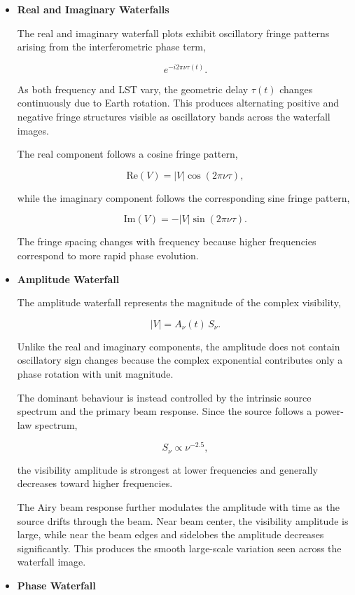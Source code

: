 \documentclass{article}
\begin{document}
\begin{itemize}

\item \textbf{Real and Imaginary Waterfalls}

The real and imaginary waterfall plots exhibit oscillatory fringe patterns arising from the interferometric phase term,

\[
e^{-i2\pi\nu\tau(t)}.
\]

As both frequency and LST vary, the geometric delay $\tau(t)$ changes continuously due to Earth rotation. This produces alternating positive and negative fringe structures visible as oscillatory bands across the waterfall images.

The real component follows a cosine fringe pattern,

\[
\mathrm{Re}(V)
=
|V|
\cos(2\pi\nu\tau),
\]

while the imaginary component follows the corresponding sine fringe pattern,

\[
\mathrm{Im}(V)
=
-|V|
\sin(2\pi\nu\tau).
\]

The fringe spacing changes with frequency because higher frequencies correspond to more rapid phase evolution.

\item \textbf{Amplitude Waterfall}

The amplitude waterfall represents the magnitude of the complex visibility,

\[
|V|
=
A_\nu(t)\, S_\nu.
\]

Unlike the real and imaginary components, the amplitude does not contain oscillatory sign changes because the complex exponential contributes only a phase rotation with unit magnitude.

The dominant behaviour is instead controlled by the intrinsic source spectrum and the primary beam response. Since the source follows a power-law spectrum,

\[
S_\nu \propto \nu^{-2.5},
\]

the visibility amplitude is strongest at lower frequencies and generally decreases toward higher frequencies.

The Airy beam response further modulates the amplitude with time as the source drifts through the beam. Near beam center, the visibility amplitude is large, while near the beam edges and sidelobes the amplitude decreases significantly. This produces the smooth large-scale variation seen across the waterfall image.

\item \textbf{Phase Waterfall}


\end{itemize}
\end{document}
